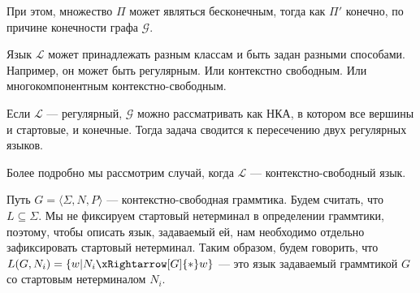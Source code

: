 При этом, множество $\Pi$ может являться бесконечным, тогда как $\Pi'$ конечно, по причине конечности графа $\mathcal{G}$.

Язык $\mathcal{L}$ может принадлежать разным классам и быть задан разными способами.
Например, он может быть регулярным.
Или контекстно свободным.
Или многокомпонентным контекстно-свободным.

Если $\mathcal{L}$ --- регулярный, $\mathcal{G}$ можно рассматривать как НКА, в котором все вершины и стартовые, и конечные.
Тогда задача сводится к пересечению двух регулярных языков.

Более подробно мы рассмотрим случай, когда $\mathcal{L}$ --- контекстно-свободный язык.

Путь $G = \langle \Sigma, N, P \rangle$ --- контекстно-свободная граммтика.
Будем считать, что $L \subseteq \Sigma$.
Мы не фиксируем стартовый нетерминал в определении граммтики, поэтому, чтобы описать язык, задаваемый ей, нам необходимо отдельно зафиксировать стартовый нетерминал.
Таким образом, будем говорить, что $L(G,N_i) = \{ w | N_i \xRightarrow[G]{*} w  \}$ --- это язык задаваемый граммтикой $G$ со стартовым нетерминалом $N_i$.


